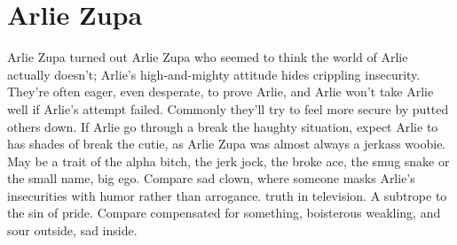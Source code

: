 \documentclass[12pt]{book}
\begin{document}
\chapter{Arlie Zupa}

Arlie Zupa turned out Arlie Zupa who seemed to think the world of Arlie actually doesn't; Arlie's high-and-mighty attitude hides crippling insecurity. They're often eager, even desperate, to prove Arlie, and Arlie won't take Arlie well if Arlie's attempt failed. Commonly they'll try to feel more secure by putted others down. If Arlie go through a break the haughty situation, expect Arlie to has shades of break the cutie, as Arlie Zupa was almost always a jerkass woobie. May be a trait of the alpha bitch, the jerk jock, the broke ace, the smug snake or the small name, big ego. Compare sad clown, where someone masks Arlie's insecurities with humor rather than arrogance. truth in television. A subtrope to the sin of pride. Compare compensated for something, boisterous weakling, and sour outside, sad inside.
\end{document}
